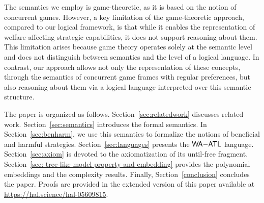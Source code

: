 \documentclass{article}
\newcommand{\appsec}[2]{%
  \ifarxiv Appendix~\ref{#1}\else Appendix, Section ``#2''\fi%
}
\begin{document}
The semantics we employ is game-theoretic, as it is based on the notion of concurrent games. However, a key limitation of the game-theoretic approach, compared to our logical framework, is that while it enables the representation of welfare-affecting strategic capabilities, it does not support reasoning about them. This limitation arises because game theory operates solely at the semantic level and does not distinguish between semantics and the level of a logical language. In contrast, our approach allows not only the representation of these concepts, through the semantics of concurrent game frames with regular preferences, but also reasoning about them via a logical language interpreted over this semantic structure.

 


The paper is organized as follows. 
Section~\ref{sec:relatedwork} discusses related work. 
Section~\ref{sec:semantics} introduces the formal semantics. 
In Section~\ref{sec:benharm}, we use this semantics to formalize the notions of beneficial and harmful strategies. 
Section~\ref{sec:languages} presents the $\mathsf{WA{-}ATL}$ language.   
Section~\ref{sec:axiom} is devoted to the axiomatization of its
until-free fragment. 
Section~\ref{sec: tree-like model property and embedding} provides  the polynomial embeddings and
the complexity results. 
 Finally, Section~\ref{conclusion} concludes the paper. Proofs are provided in the
 extended version of this paper available at \url{https://hal.science/hal-05609815}. 





\end{document}
